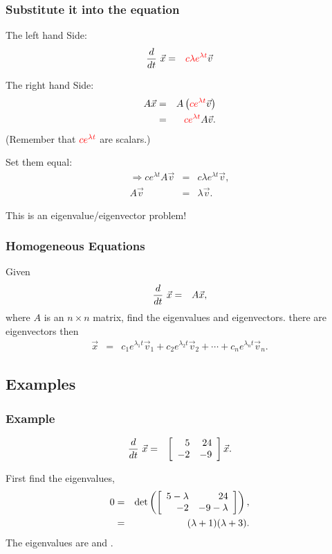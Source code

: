 \begin{frame}
  \frametitle{Substitute it into the equation}

  The left hand Side:
  \begin{eqnarray*}
    \deriv{~}{t} \vec{x} & = & \redText{c \lambda e^{\lambda t}} \vec{v} \\
  \end{eqnarray*}

  {
    The right hand Side:
    \begin{eqnarray*}
      A \vec{x} & = &  A \lp \redText{c e^{\lambda t}} \vec{v} \rp \\
      & = & \redText{c e^{\lambda t}} A \vec{v}.
    \end{eqnarray*}
    (Remember that $\redText{c e^{\lambda t}}$ are scalars.)
  }

  {
    Set them equal:
    \begin{eqnarray*}
      \Rightarrow c  e^{\lambda t} A \vec{v} & = & c \lambda e^{\lambda t} \vec{v}, \\
      A \vec{v} & = & \lambda \vec{v}.
    \end{eqnarray*}
  }

  {
    This is an eigenvalue/eigenvector problem!
  }

\end{frame}


\begin{frame}
  \frametitle{Homogeneous Equations}

  Given
  \begin{eqnarray*}
    \deriv{~}{t} \vec{x} & = & A \vec{x},
  \end{eqnarray*}
  where $A$ is an $n\times n$ matrix, find the eigenvalues and
  eigenvectors.  there are  eigenvectors then
  \begin{eqnarray*}
    \vec{x} & = & c_1 e^{\lambda_1 t} \vec{v}_1 + c_2 e^{\lambda_2 t} \vec{v}_2 +
    \cdots + c_n e^{\lambda_n t} \vec{v}_n.
  \end{eqnarray*}

\end{frame}

\subsection{Examples}


\begin{frame}
  \frametitle{Example}

  \begin{eqnarray*}
    \deriv{~}{t} \vec{x} & = & \arrayTwo{5}{24}{-2}{-9} \vec{x}.
  \end{eqnarray*}

  {
    First find the eigenvalues,
    \begin{eqnarray*}
      0 & = & \det\lp\arrayTwo{5-\lambda}{24}{-2}{-9-\lambda}\rp, \\
      & = & (\lambda+1)(\lambda+3).
    \end{eqnarray*}
    The eigenvalues are  and .
  }

\end{frame}


